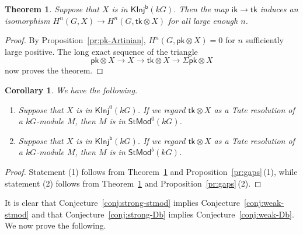 \documentclass[12pt]{amsart}
\newcommand{\ik}{\mathsf{ik}}
\newcommand{\kG}{\kk G}
\newcommand{\kk}{k}
\newcommand{\KInj}{\mathsf{KInj}}
\newcommand{\KInjb}{\KInj^{\mathsf{b}}}
\newcommand{\pk}{\mathsf{pk}}
\newcommand{\StMod}{\mathsf{StMod}}
\newcommand{\tk}{\mathsf{tk}}
\numberwithin{equation}{section}
\theoremstyle{plain}
\newtheorem{theorem}[equation]{Theorem}
\newtheorem{corollary}[equation]{Corollary}
\theoremstyle{definition}
\theoremstyle{remark}
\begin{document}
\begin{theorem}\label{th:tX}
Suppose that $X$ is in $\KInjb(\kG)$.
Then the map $\ik\to\tk$ induces an isomorphism $H^n(G,X)\to
H^n(G,\tk\otimes X)$ for all large enough $n$.
\end{theorem}
\begin{proof}
By
Proposition~\ref{pr:pk-Artinian}, $H^n(G,\pk \otimes X)=0$ for $n$
sufficiently large positive. The long exact sequence of the
triangle 
\[ \pk \otimes X \to X \to \tk\otimes X \to \Sigma\pk\otimes X \]
now proves the theorem.
\end{proof}

\begin{corollary}\label{co:tX}
We have the following.
\begin{enumerate}
\item
Suppose that $X$ is in $\KInj^0(\kG)$. If we regard $\tk\otimes X$
as a Tate resolution of a $\kG$-module $M$, then $M$ is in
$\StMod^0(\kG)$.
\item
Suppose that $X$ is in $\KInjb(\kG)$.
If we regard $\tk\otimes X$ as a Tate resolution of a $\kG$-module
$M$, then $M$ is in $\StMod^b(\kG)$.
\end{enumerate}
\end{corollary}
\begin{proof}
Statement (1) follows from Theorem~\ref{th:tX} and
Proposition~\ref{pr:gaps}\,(1), while statement
(2) follows from Theorem~\ref{th:tX} and
Proposition~\ref{pr:gaps}\,(2).
\end{proof}


It is clear that Conjecture~\ref{conj:strong-stmod} implies
Conjecture~\ref{conj:weak-stmod} and that
Conjecture~\ref{conj:strong-Db} implies Conjecture~\ref{conj:weak-Db}.
We now prove the following.
\end{document}
